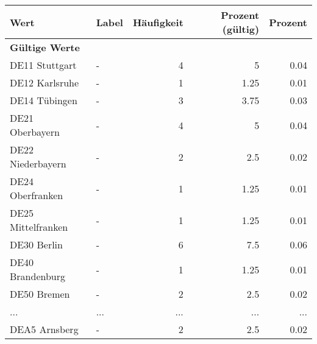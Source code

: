      \begin{longtable}{Xlrrr}
     \toprule
     \textbf{Wert} & \textbf{Label} & \textbf{Häufigkeit} & \textbf{Prozent (gültig)} & \textbf{Prozent} \\
     \endhead
     \midrule
     \multicolumn{5}{l}{\textbf{Gültige Werte}}\\
        \multicolumn{1}{X}{DE11 Stuttgart} & - & \num{4} & \num[round-mode=places,round-precision=2]{5} & \num[round-mode=places,round-precision=2]{0.04} \\
        \multicolumn{1}{X}{DE12 Karlsruhe} & - & \num{1} & \num[round-mode=places,round-precision=2]{1.25} & \num[round-mode=places,round-precision=2]{0.01} \\
        \multicolumn{1}{X}{DE14 Tübingen} & - & \num{3} & \num[round-mode=places,round-precision=2]{3.75} & \num[round-mode=places,round-precision=2]{0.03} \\
        \multicolumn{1}{X}{DE21 Oberbayern} & - & \num{4} & \num[round-mode=places,round-precision=2]{5} & \num[round-mode=places,round-precision=2]{0.04} \\
        \multicolumn{1}{X}{DE22 Niederbayern} & - & \num{2} & \num[round-mode=places,round-precision=2]{2.5} & \num[round-mode=places,round-precision=2]{0.02} \\
        \multicolumn{1}{X}{DE24 Oberfranken} & - & \num{1} & \num[round-mode=places,round-precision=2]{1.25} & \num[round-mode=places,round-precision=2]{0.01} \\
        \multicolumn{1}{X}{DE25 Mittelfranken} & - & \num{1} & \num[round-mode=places,round-precision=2]{1.25} & \num[round-mode=places,round-precision=2]{0.01} \\
        \multicolumn{1}{X}{DE30 Berlin} & - & \num{6} & \num[round-mode=places,round-precision=2]{7.5} & \num[round-mode=places,round-precision=2]{0.06} \\
        \multicolumn{1}{X}{DE40 Brandenburg} & - & \num{1} & \num[round-mode=places,round-precision=2]{1.25} & \num[round-mode=places,round-precision=2]{0.01} \\
        \multicolumn{1}{X}{DE50 Bremen} & - & \num{2} & \num[round-mode=places,round-precision=2]{2.5} & \num[round-mode=places,round-precision=2]{0.02} \\
       ... & ... & ... & ... & ... \\
        \multicolumn{1}{X}{DEA5 Arnsberg} & - & \num{2} & \num[round-mode=places,round-precision=2]{2.5} & \num[round-mode=places,round-precision=2]{0.02} \\

\end{longtable}
